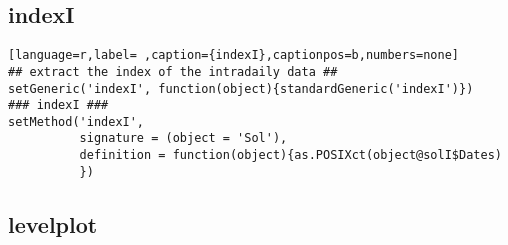 \subsection{indexI}
\label{sec:org3b015c6}
\label{subsec:indexi}
\begin{lstlisting}[language=r,label= ,caption={indexI},captionpos=b,numbers=none]
## extract the index of the intradaily data ##
setGeneric('indexI', function(object){standardGeneric('indexI')})
### indexI ###
setMethod('indexI',
          signature = (object = 'Sol'),
          definition = function(object){as.POSIXct(object@solI$Dates)
          })
\end{lstlisting}
\subsection{levelplot}
\label{sec:org5c0401b}
\label{subsec:levelplot}
